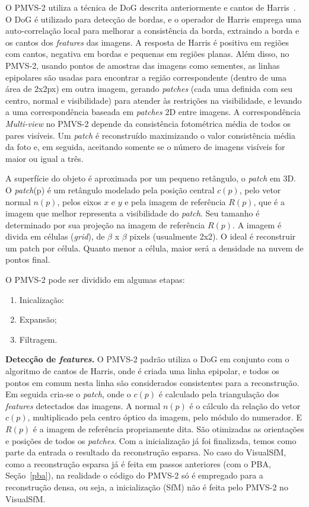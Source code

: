 O PMVS-2 utiliza a técnica de DoG descrita anteriormente e cantos de
Harris~\cite{Harris:Stephens:Edge:Corner}. O DoG é utilizado para detecção de
bordas, e o operador de Harris emprega uma auto-correlação local para
melhorar a consistência da borda, extraindo a borda e os cantos dos
\emph{features} das imagens. A resposta de Harris é positiva em regiões com
cantos, negativa em bordas e pequenas em regiões planas. Além disso, no PMVS-2,
usando pontos de amostras das imagens como sementes, as linhas epipolares são
usadas para encontrar a região correspondente (dentro de uma área de 2x2px) em
outra imagem, gerando \emph{patches} (cada uma definida com seu centro, normal e
visibilidade) para atender às restrições na visibilidade, e levando a uma
correspondência baseada em \emph{patches} 2D entre imagens. A correspondência
\emph{Multi-view} no PMVS-2 depende da
consistência fotométrica média de todos os pares visíveis. Um \emph{patch} é
reconstruído maximizando o valor consistência média da foto e, em
seguida, aceitando somente se o número de imagens visíveis for maior ou igual a
três.

A superfície do objeto é aproximada por um pequeno retângulo, o \emph{patch} em
3D.  O \emph{patch}(p) é um retângulo modelado pela posição central $c(p)$, pelo
vetor normal $n(p)$, pelos eixos $x$ e $y$ e pela imagem de referência $R(p)$,
que é a imagem que melhor representa a visibilidade do \emph{patch}. Seu
tamanho é determinado por sua projeção na imagem de referência $R(p)$.
A imagem é divida em células (\emph{grid}), de $\beta$ x $\beta$ pixels
(usualmente 2x2). O ideal é reconstruir um patch por célula. Quanto menor a
célula, maior será a densidade na nuvem de pontos final.

O PMVS-2 pode ser dividido em algumas etapas:
\begin{enumerate}
\item{Inicalização:}
\item{Expansão;}
\item{Filtragem.}
\end{enumerate}

\noindent\textbf{Detecção de \emph{features}.}
O PMVS-2 padrão utiliza o DoG em conjunto com o algoritmo de cantos de Harris,
onde é criada uma linha epipolar, e todos os pontos em comum nesta linha são
considerados consistentes para a reconstrução.  Em seguida cria-se o
\emph{patch},
onde o $c(p)$ é calculado pela triangulação dos \emph{features} detectados das
imagens. A normal $n(p)$ é o cálculo da relação do vetor $c(p)$, multiplicado
pela centro óptico da imagem, pelo módulo do numerador. E $R(p)$ é a imagem de
referência propriamente dita. São otimizadas as orientações e posições de todos
os \emph{patches}. Com a inicialização já foi finalizada, temos como parte da
entrada o resultado da reconstrução esparsa. No caso do VisualSfM, como a
reconstrução esparsa já é feita em passos anteriores (com o PBA, Seção~\ref{pba}), na
realidade o código do PMVS-2 só é empregado para a reconstrução densa, ou seja, a
inicialização (SfM) não é feita pelo PMVS-2 no VisualSfM.

